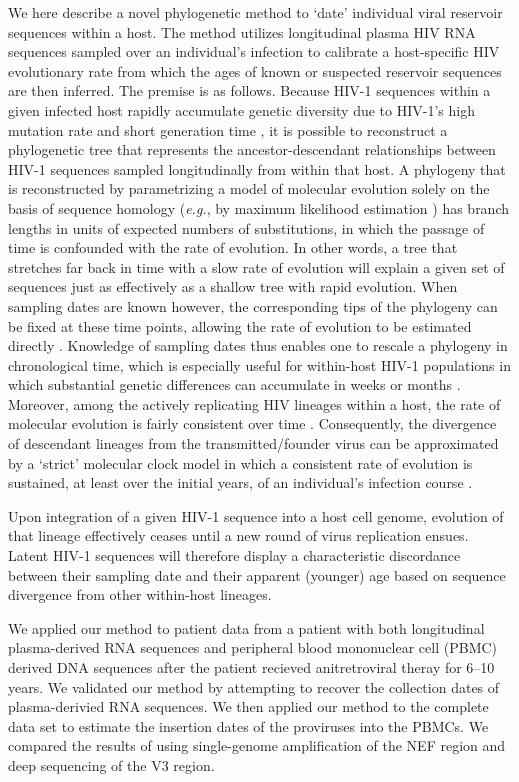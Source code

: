 \documentclass[12pt,onecolumn,twoside]{pnas-new}
\begin{document}
We here describe a novel phylogenetic method to `date' individual viral reservoir sequences within a host.
The method utilizes longitudinal plasma HIV RNA sequences sampled over an individual's infection to calibrate a host-specific HIV evolutionary rate from which the ages of known or suspected reservoir sequences are then inferred. The premise is as follows.
Because HIV-1 sequences within a given infected host rapidly accumulate genetic diversity due to HIV-1's high mutation rate and short generation time \cite{Alizon13,Rambaut04,Shankarappa99}, it is possible to reconstruct a phylogenetic tree that represents the ancestor-descendant relationships between HIV-1 sequences sampled longitudinally from within that host.
A phylogeny that is reconstructed by parametrizing a model of molecular evolution solely on the basis of sequence homology (\emph{e.g.}, by maximum likelihood estimation \cite{Felsenstein81}) has branch lengths in units of expected numbers of substitutions, in which the passage of time is confounded with the rate of evolution.
In other words, a tree that stretches far back in time with a slow rate of evolution will explain a given set of sequences just as effectively as a shallow tree with rapid evolution.
When sampling dates are known however, the corresponding tips of the phylogeny can be fixed at these time points, allowing the rate of evolution to be estimated directly \cite{Rodrigo99}.
Knowledge of sampling dates thus enables one to rescale a phylogeny in chronological time, which is especially useful for within-host HIV-1 populations in which substantial genetic differences can accumulate in weeks or months \cite{Williamson03}.
Moreover, among the actively replicating HIV lineages within a host, the rate of molecular evolution is fairly consistent over time \cite{Korber00,Kuhner95,Leitner99,Park16}.
Consequently, the divergence of descendant lineages from the transmitted/founder virus can be approximated by a `strict' molecular clock model in which a consistent rate of evolution is sustained, at least over the initial years, of an individual's infection course \cite{Keele08}. 

Upon integration of a given HIV-1 sequence into a host cell genome, evolution of that lineage effectively ceases until a new round of virus replication ensues.
Latent HIV-1 sequences will therefore display a characteristic discordance between their sampling date and their apparent (younger) age based on sequence divergence from other within-host lineages.

We applied our method to patient data from a patient with both longitudinal plasma-derived RNA sequences and peripheral blood mononuclear cell (PBMC) derived DNA sequences after the patient recieved anitretroviral theray for 6--10 years.
We validated our method by attempting to recover the collection dates of plasma-derivied RNA sequences.
We then applied our method to the complete data set to estimate the insertion dates of the proviruses into the PBMCs.
We compared the results of using single-genome amplification of the NEF region and deep sequencing of the V3 region.
\end{document}
